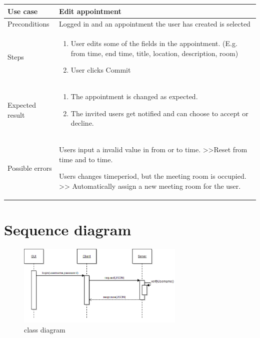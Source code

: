 \documentclass[a4paper, 10pt]{article}
\begin{document}
\begin{tabularx}{\textwidth}{ |X|X| }
\hline
\rowcolor{Gray}
Use case &  Edit appointment \\ \hline
Preconditions & Logged in and an appointment the user has created is selected \\ \hline
Steps & 
\begin{enumerate}
	\item User edits some of the fields in the appointment. (E.g. from time, end time, title, location, description, room)
	\item User clicks Commit
\end{enumerate}\\ \hline
Expected result & 
\begin{enumerate}
	\item The appointment is changed as expected. 
	\item The invited users get notified and can choose to accept or decline.
\end{enumerate} \\ \hline
Possible errors & 
\begin{scenario}
	\item Users input a invalid value in from or to time. >>Reset from time and to time.
	\item Users changes timeperiod, but the meeting room is occupied. >> Automatically assign a new meeting room for the user.
\end{scenario} \\ \hline
\end{tabularx}

\newpage

\section{Sequence diagram}
\begin{figure}[h!] 
    \begin{center}  
        \includegraphics[width=8cm]{img/seqLogin.png}
        \caption{class diagram}
    \label{class}
    \end{center}
\end{figure}
\end{document}

